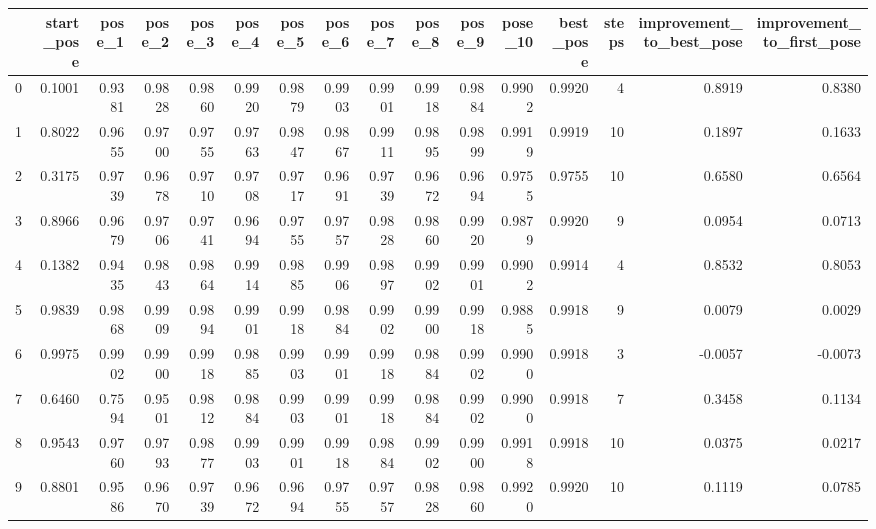 \begin{tabular}{lrrrrrrrrrrrrrrr}
\toprule
{} &  start\_pose &  pose\_1 &  pose\_2 &  pose\_3 &  pose\_4 &  pose\_5 &  pose\_6 &  pose\_7 &  pose\_8 &  pose\_9 &  pose\_10 &  best\_pose &  steps &  improvement\_to\_best\_pose &  improvement\_to\_first\_pose \\
\midrule
0   &      0.1001 &  0.9381 &  0.9828 &  0.9860 &  0.9920 &  0.9879 &  0.9903 &  0.9901 &  0.9918 &  0.9884 &   0.9902 &     0.9920 &      4 &                    0.8919 &                     0.8380 \\
1   &      0.8022 &  0.9655 &  0.9700 &  0.9755 &  0.9763 &  0.9847 &  0.9867 &  0.9911 &  0.9895 &  0.9899 &   0.9919 &     0.9919 &     10 &                    0.1897 &                     0.1633 \\
2   &      0.3175 &  0.9739 &  0.9678 &  0.9710 &  0.9708 &  0.9717 &  0.9691 &  0.9739 &  0.9672 &  0.9694 &   0.9755 &     0.9755 &     10 &                    0.6580 &                     0.6564 \\
3   &      0.8966 &  0.9679 &  0.9706 &  0.9741 &  0.9694 &  0.9755 &  0.9757 &  0.9828 &  0.9860 &  0.9920 &   0.9879 &     0.9920 &      9 &                    0.0954 &                     0.0713 \\
4   &      0.1382 &  0.9435 &  0.9843 &  0.9864 &  0.9914 &  0.9885 &  0.9906 &  0.9897 &  0.9902 &  0.9901 &   0.9902 &     0.9914 &      4 &                    0.8532 &                     0.8053 \\
5   &      0.9839 &  0.9868 &  0.9909 &  0.9894 &  0.9901 &  0.9918 &  0.9884 &  0.9902 &  0.9900 &  0.9918 &   0.9885 &     0.9918 &      9 &                    0.0079 &                     0.0029 \\
6   &      0.9975 &  0.9902 &  0.9900 &  0.9918 &  0.9885 &  0.9903 &  0.9901 &  0.9918 &  0.9884 &  0.9902 &   0.9900 &     0.9918 &      3 &                   -0.0057 &                    -0.0073 \\
7   &      0.6460 &  0.7594 &  0.9501 &  0.9812 &  0.9884 &  0.9903 &  0.9901 &  0.9918 &  0.9884 &  0.9902 &   0.9900 &     0.9918 &      7 &                    0.3458 &                     0.1134 \\
8   &      0.9543 &  0.9760 &  0.9793 &  0.9877 &  0.9903 &  0.9901 &  0.9918 &  0.9884 &  0.9902 &  0.9900 &   0.9918 &     0.9918 &     10 &                    0.0375 &                     0.0217 \\
9   &      0.8801 &  0.9586 &  0.9670 &  0.9739 &  0.9672 &  0.9694 &  0.9755 &  0.9757 &  0.9828 &  0.9860 &   0.9920 &     0.9920 &     10 &                    0.1119 &                     0.0785 \\

\end{tabular}
